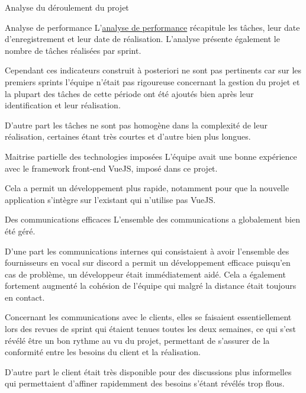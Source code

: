 \documentclass[]{article}
\begin{document}
{\begin{section}{Analyse du déroulement du projet}
 \begin{subsection}{Analyse de performance}
     L'\href{Analyse_de_performance.ods}{analyse de performance} récapitule les tâches, leur date d'enregistrement et leur date de réalisation. L'analyse présente également le nombre de tâches réalisées par sprint.

     Cependant ces indicateurs construit à posteriori ne sont pas pertinents car sur les premiers sprints l'équipe n'était pas rigoureuse concernant la gestion du projet et la plupart des tâches de cette période ont été ajoutés bien après leur identification et leur réalisation.

     D'autre part les tâches ne sont pas homogène dans la complexité de leur réalisation, certaines étant très courtes et d'autre bien plus longues.
 \end{subsection}

 \begin{subsection}{Maitrise partielle des technologies imposées }
     L'équipe avait une bonne expérience avec le framework front-end VueJS, imposé dans ce projet.

     Cela a permit un développement plus rapide, notamment pour que la nouvelle application s'intègre sur l'existant qui n'utilise pas VueJS.
 \end{subsection}

 \begin{subsection}{Des communications efficaces}
     L'ensemble des communications a globalement bien été géré.

     D'une part les communications internes qui consistaient à avoir l'ensemble des fournisseurs en vocal sur discord a permit un développement efficace puisqu'en cas de problème, un développeur était immédiatement aidé. Cela a également fortement augmenté la cohésion de l'équipe qui malgré la distance était toujours en contact.

     Concernant les communications avec le clients, elles se faisaient essentiellement lors des revues de sprint qui étaient tenues toutes les deux semaines, ce qui s'est révélé être un bon rythme au vu du projet, permettant de s'assurer de la conformité entre les besoins du client et la réalisation.

     D'autre part le client était très disponible pour des discussions plus informelles qui permettaient d'affiner rapidemment des besoins s'étant révélés trop flous.
 \end{subsection}


\end{section}}
\end{document}
